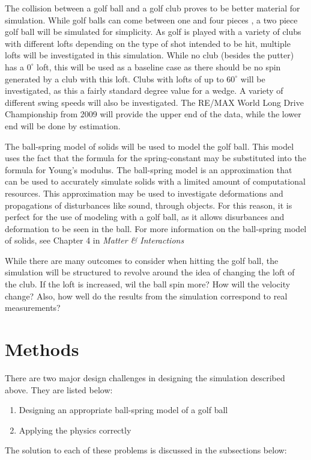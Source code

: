 \documentclass{article}
\begin{document}
The collision between a golf ball and a golf club proves to be better material for simulation. While golf balls can come between one and four pieces \cite{general}, a two piece golf ball will be simulated for simplicity. As golf is played with a variety of clubs with dif\mbox{f}erent lofts depending on the type of shot intended to be hit, multiple lofts will be investigated in this simulation. While no club (besides the putter) has a $0^{\circ}$ loft, this will be used as a baseline case as there should be no spin generated by a club with this loft. Clubs with lofts of up to $60^{\circ}$ will be investigated, as this a fairly standard degree value for a wedge. A variety of dif\mbox{f}erent swing speeds will also be investigated. The RE/MAX World Long Drive Championship from 2009 will provide the upper end of the data, while the lower end will be done by estimation.

The ball-spring model of solids will be used to model the golf ball. This model uses the fact that the formula for the spring-constant may be substituted into the formula for Young's modulus. The ball-spring model is an approximation that can be used to accurately simulate solids with a limited amount of computational resources. This approximation may be used to investigate deformations and propagations of disturbances like sound, through objects. For this reason, it is perfect for the use of modeling with a golf ball, as it allows disurbances and deformation to be seen in the ball. For more information on the ball-spring model of solids, see Chapter 4 in \textit{Matter \& Interactions} \cite{sherwood}

While there are many outcomes to consider when hitting the golf ball, the simulation will be structured to revolve around the idea of changing the loft of the club. If the loft is increased, wil the ball spin more? How will the velocity change? Also, how well do the results from the simulation correspond to real measurements?

\section{Methods}

There are two major design challenges in designing the simulation described above. They are listed below: \begin{enumerate}[1.]
\item Designing an appropriate ball-spring model of a golf ball
\item Applying the physics correctly
\end{enumerate}
The solution to each of these problems is discussed in the subsections below:
\end{document}
